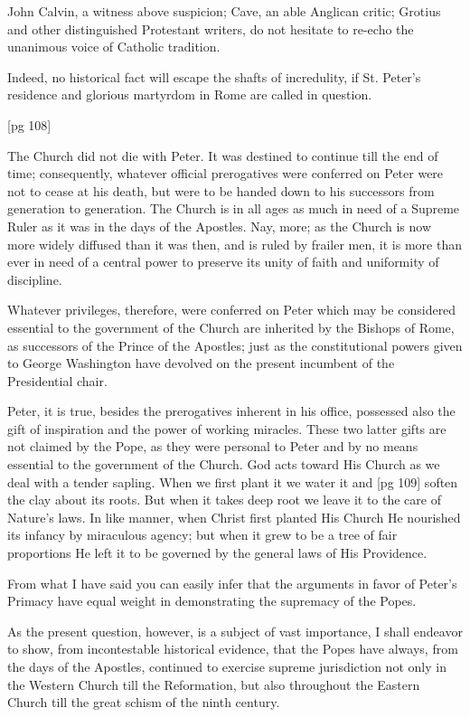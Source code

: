 John Calvin, a witness above suspicion; Cave,
an able Anglican critic; Grotius and other distinguished
Protestant writers, do not hesitate to re-echo
the unanimous voice of Catholic tradition.

Indeed, no historical fact will escape the shafts
of incredulity, if St. Peter's residence and glorious
martyrdom in Rome are called in question.

[pg 108]


The Church did not die with Peter. It was
destined to continue till the end of time; consequently,
whatever official prerogatives were
conferred on Peter were not to cease at his death,
but were to be handed down to his successors from
generation to generation. The Church is in all
ages as much in need of a Supreme Ruler as it
was in the days of the Apostles. Nay, more; as
the Church is now more widely diffused than it
was then, and is ruled by frailer men, it is more
than ever in need of a central power to preserve
its unity of faith and uniformity of discipline.

Whatever privileges, therefore, were conferred
on Peter which may be considered essential to the
government of the Church are inherited by the
Bishops of Rome, as successors of the Prince of
the Apostles; just as the constitutional powers
given to George Washington have devolved on
the present incumbent of the Presidential chair.

Peter, it is true, besides the prerogatives inherent
in his office, possessed also the gift of inspiration
and the power of working miracles. These
two latter gifts are not claimed by the Pope, as
they were personal to Peter and by no means essential
to the government of the Church. God
acts toward His Church as we deal with a tender
sapling. When we first plant it we water it and
[pg 109]
soften the clay about its roots. But when it takes
deep root we leave it to the care of Nature's laws.
In like manner, when Christ first planted His
Church He nourished its infancy by miraculous
agency; but when it grew to be a tree of fair proportions
He left it to be governed by the general
laws of His Providence.

From what I have said you can easily infer
that the arguments in favor of Peter's Primacy
have equal weight in demonstrating the supremacy
of the Popes.

As the present question, however, is a subject of
vast importance, I shall endeavor to show, from
incontestable historical evidence, that the Popes
have always, from the days of the Apostles, continued
to exercise supreme jurisdiction not only in
the Western Church till the Reformation, but also
throughout the Eastern Church till the great
schism of the ninth century.

